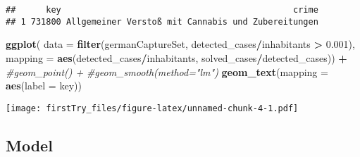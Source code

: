 \documentclass[
]{article}
\newenvironment{Shaded}{\begin{snugshade}}{\end{snugshade}}
\newcommand{\CommentTok}[1]{\textcolor[rgb]{0.56,0.35,0.01}{\textit{#1}}}
\newcommand{\DataTypeTok}[1]{\textcolor[rgb]{0.13,0.29,0.53}{#1}}
\newcommand{\FloatTok}[1]{\textcolor[rgb]{0.00,0.00,0.81}{#1}}
\newcommand{\KeywordTok}[1]{\textcolor[rgb]{0.13,0.29,0.53}{\textbf{#1}}}
\newcommand{\NormalTok}[1]{#1}
\newcommand{\OperatorTok}[1]{\textcolor[rgb]{0.81,0.36,0.00}{\textbf{#1}}}
\newcommand{\StringTok}[1]{\textcolor[rgb]{0.31,0.60,0.02}{#1}}
\begin{document}
\begin{verbatim}
##      key                                              crime
## 1 731800 Allgemeiner Verstoß mit Cannabis und Zubereitungen
\end{verbatim}

\begin{Shaded}
\begin{Highlighting}[]
\KeywordTok{ggplot}\NormalTok{(}
  \DataTypeTok{data =} \KeywordTok{filter}\NormalTok{(germanCaptureSet, detected_cases}\OperatorTok{/}\NormalTok{inhabitants }\OperatorTok{>}\StringTok{ }\FloatTok{0.001}\NormalTok{),}
  \DataTypeTok{mapping =} \KeywordTok{aes}\NormalTok{(detected_cases}\OperatorTok{/}\NormalTok{inhabitants, solved_cases}\OperatorTok{/}\NormalTok{detected_cases)) }\OperatorTok{+}
\StringTok{  }\CommentTok{#geom_point() +}
\StringTok{  }\CommentTok{#geom_smooth(method="lm")}
\StringTok{  }\KeywordTok{geom_text}\NormalTok{(}\DataTypeTok{mapping =} \KeywordTok{aes}\NormalTok{(}\DataTypeTok{label =}\NormalTok{ key))}
\end{Highlighting}
\end{Shaded}

\texttt{[image: firstTry\_files/figure-latex/unnamed-chunk-4-1.pdf]}

\hypertarget{model}{%
\subsection{Model}\label{model}}
\end{document}
